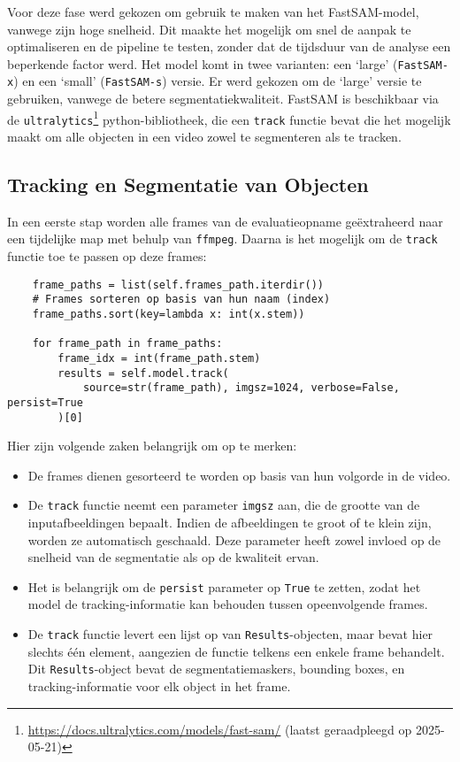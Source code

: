 Voor deze fase werd gekozen om gebruik te maken van het FastSAM-model, vanwege zijn hoge snelheid.
Dit maakte het mogelijk om snel de aanpak te optimaliseren en de pipeline te testen, zonder dat de tijdsduur van de analyse een beperkende factor werd.
Het model komt in twee varianten: een `large' (\texttt{FastSAM-x}) en een `small' (\texttt{FastSAM-s}) versie.
Er werd gekozen om de `large' versie te gebruiken, vanwege de betere segmentatiekwaliteit.
FastSAM is beschikbaar via de \texttt{ultralytics}\footnote{\url{https://docs.ultralytics.com/models/fast-sam/} (laatst geraadpleegd op 2025-05-21)} python-bibliotheek,
die een \texttt{track} functie bevat die het mogelijk maakt om alle objecten in een video zowel te segmenteren als te tracken.

\subsection{Tracking en Segmentatie van Objecten}

In een eerste stap worden alle frames van de evaluatieopname geëxtraheerd naar een tijdelijke map met behulp van \texttt{ffmpeg}.
Daarna is het mogelijk om de \texttt{track} functie toe te passen op deze frames:

\begin{listing}[H]
  \begin{verbatim}
    frame_paths = list(self.frames_path.iterdir())
    # Frames sorteren op basis van hun naam (index)
    frame_paths.sort(key=lambda x: int(x.stem))

    for frame_path in frame_paths:
        frame_idx = int(frame_path.stem)
        results = self.model.track(
            source=str(frame_path), imgsz=1024, verbose=False, persist=True
        )[0]
    \end{verbatim}
  \caption[Tracking van objecten met FastSAM]{}
\end{listing}

Hier zijn volgende zaken belangrijk om op te merken:
\begin{itemize}
    \item De frames dienen gesorteerd te worden op basis van hun volgorde in de video.
    \item De \texttt{track} functie neemt een parameter \texttt{imgsz} aan, die de grootte van de inputafbeeldingen bepaalt.
    Indien de afbeeldingen te groot of te klein zijn, worden ze automatisch geschaald.
    Deze parameter heeft zowel invloed op de snelheid van de segmentatie als op de kwaliteit ervan.
    \item Het is belangrijk om de \texttt{persist} parameter op \texttt{True} te zetten, 
    zodat het model de tracking-informatie kan behouden tussen opeenvolgende frames.
    \item De \texttt{track} functie levert een lijst op van \texttt{Results}-objecten, maar bevat hier slechts één element, aangezien de functie telkens een enkele frame behandelt.
    Dit \texttt{Results}-object bevat de segmentatiemaskers, bounding boxes, en tracking-informatie voor elk object in het frame.
\end{itemize}

